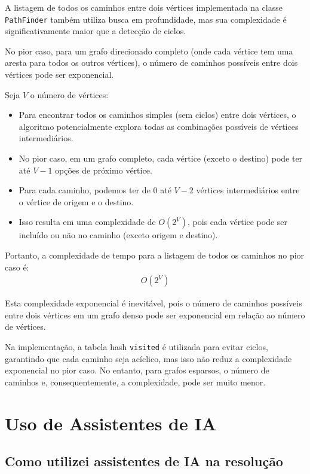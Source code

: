 \documentclass[12pt]{article}
\begin{document}
A listagem de todos os caminhos entre dois vértices implementada na classe \texttt{PathFinder} também utiliza busca em profundidade, mas sua complexidade é significativamente maior que a detecção de ciclos.

No pior caso, para um grafo direcionado completo (onde cada vértice tem uma aresta para todos os outros vértices), o número de caminhos possíveis entre dois vértices pode ser exponencial.

Seja $V$ o número de vértices:

\begin{itemize}
    \item Para encontrar todos os caminhos simples (sem ciclos) entre dois vértices, o algoritmo potencialmente explora todas as combinações possíveis de vértices intermediários.
    \item No pior caso, em um grafo completo, cada vértice (exceto o destino) pode ter até $V-1$ opções de próximo vértice.
    \item Para cada caminho, podemos ter de 0 até $V-2$ vértices intermediários entre o vértice de origem e o destino.
    \item Isso resulta em uma complexidade de $O(2^V)$, pois cada vértice pode ser incluído ou não no caminho (exceto origem e destino).
\end{itemize}

Portanto, a complexidade de tempo para a listagem de todos os caminhos no pior caso é:
\begin{align}
    O(2^V)
\end{align}

Esta complexidade exponencial é inevitável, pois o número de caminhos possíveis entre dois vértices em um grafo denso pode ser exponencial em relação ao número de vértices.

Na implementação, a tabela hash \texttt{visited} é utilizada para evitar ciclos, garantindo que cada caminho seja acíclico, mas isso não reduz a complexidade exponencial no pior caso. No entanto, para grafos esparsos, o número de caminhos e, consequentemente, a complexidade, pode ser muito menor.

\section{Uso de Assistentes de IA}

\subsection{Como utilizei assistentes de IA na resolução}
\end{document}
